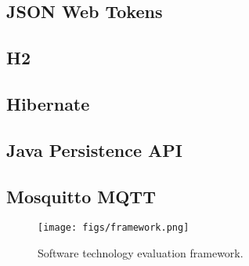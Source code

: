 \subsection{JSON Web Tokens} 

\subsection{H2} 

\subsection{Hibernate} 

\subsection{Java Persistence API} 

\subsection{Mosquitto MQTT}

\begin{figure}
  \centering
  \texttt{[image: figs/framework.png]}
  \caption{Software technology evaluation framework.}
  \label{fig:framework}
\end{figure}

